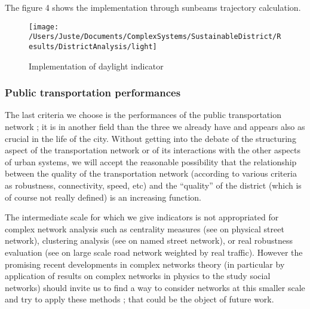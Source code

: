 \documentclass[english]{article}
\begin{document}
\bigskip{}


The figure 4 shows the implementation through sunbeams trajectory
calculation.

\begin{figure}
\hfill{}\texttt{[image: /Users/Juste/Documents/ComplexSystems/SustainableDistrict/Results/DistrictAnalysis/light]}\hfill{}\hfill{}\caption{Implementation of daylight indicator}


\end{figure}



\subsubsection{Public transportation performances}

The last criteria we choose is the performances of the public transportation
network ; it is in another field than the three we already have and
appears also as crucial in the life of the city. Without getting into
the debate of the structuring aspect of the transportation network
or of its interactions with the other aspects of urban systems, we
will accept the reasonable possibility that the relationship between the
quality of the transportation network (according to various criteria
as robustness, connectivity, speed, etc) and the ``quality'' of
the district (which is of course not really defined) is an increasing
function.

\bigskip{}


The intermediate scale for which we give indicators is not appropriated
for complex network analysis such as centrality measures (see \cite{crucitti2006centrality}
on physical street network), clustering analysis (see \cite{jiang2004topological}
on named street network), or real robustness evaluation (see \cite{RePEc:eee:transa:v:44:y:2010:i:5:p:323-336}
on large scale road network weighted by real traffic). However the promising
recent developments in complex networks theory (in particular by application
of results on complex networks in physics to the study social networks)
should invite us to find a way to consider networks at this smaller
scale and try to apply these methods ; that could be the object of
future work.

\bigskip{}
\end{document}

